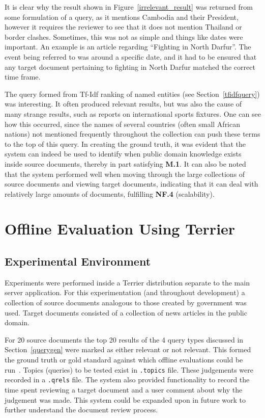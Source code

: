 \documentclass{l4proj}
\newcommand{\code}[1]{\texttt{#1}}
\begin{document}
It is clear why the result shown in Figure~\ref{irrelevant_result} was returned from some formulation of a query, as it mentions Cambodia and their President, however it requires the reviewer to see that it does not mention Thailand or border clashes. Sometimes, this was not as simple and things like dates were important. An example is an article regarding ``Fighting in North Darfur''. The event being referred to was around a specific date, and it had to be ensured that any target document pertaining to fighting in North Darfur matched the correct time frame.

The query formed from Tf-Idf ranking of named entities (see Section~\ref{tfidfquery}) was interesting. It often produced relevant results, but was also the cause of many strange results, such as reports on international sports fixtures. One can see how this occurred, since the names of several countries (often small African nations) not mentioned frequently throughout the collection can push these terms to the top of this query.
In creating the ground truth, it was evident that the system can indeed be used to identify when public domain knowledge exists inside source documents, thereby in part satisfying \textbf{M.1}. It can also be noted that the system performed well when moving through the large collections of source documents and viewing target documents, indicating that it can deal with relatively large amounts of documents, fulfilling \textbf{NF.4} (scalability).

\section{Offline Evaluation Using Terrier}\label{offlineevaluation}
\subsection{Experimental Environment}
Experiments were performed inside a Terrier distribution separate to the main server application. For this experimentation (and throughout development) a collection of source documents analogous to those created by government was used. Target documents consisted of a collection of news articles in the public domain.

For 20 source documents the top 20 results of the 4 query types discussed in Section~\ref{querygen} were marked as either relevant or not relevant. This formed the ground truth or gold standard against which offline evaluations could be run~\cite{Manning:2008:IIR:1394399}. Topics (queries) to be tested exist in \code{.topics} file. These judgements were recorded in a \code{.qrels} file. The system also provided functionality to record the time spent reviewing a target document and a user comment about why the judgement was made. This system could be expanded upon in future work to further understand the document review process.
\end{document}
